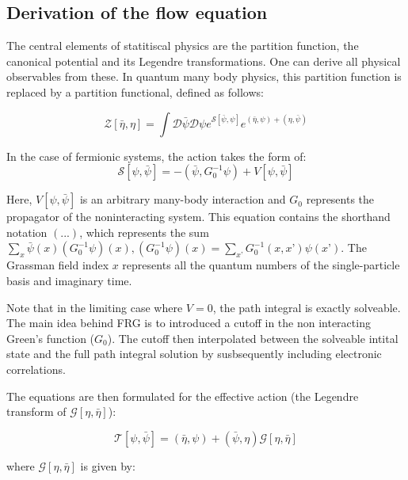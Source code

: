 \documentclass[12pt]{article}
\begin{document}
\subsection{Derivation of the flow equation}
The central elements of statitiscal physics are the partition function, the canonical potential and its Legendre transformations. One can derive all physical observables from these. In quantum many body physics, this partition function is replaced by a partition functional, defined as follows:

\begin{equation}\label{partition functional}
    \mathcal{Z}[\bar{\eta}, \eta] = \int \mathcal{D} \bar{\psi} \mathcal{D}\psi e^{\mathcal{S}[\bar{\psi}, \psi]}e^{(\bar{\eta}, \psi)+(\eta, \bar{\psi})}
\end{equation}

In the case of fermionic systems, the action takes the form of:
\begin{equation} \label{action}
    \mathcal{S}[\psi, \bar{\psi}] = -(\bar{\psi}, G_0^{-1} \psi) + V[\psi, \bar{\psi}]
\end{equation}

Here, $V[\psi, \bar{\psi}]$ is an arbitrary many-body interaction and $G_0$ represents the propagator of the noninteracting system. This equation contains the shorthand notation $(...)$, which represents the sum $\sum_x \bar{\psi}(x)(G_0^{-1}\psi)(x), (G_0^{-1}\psi)(x) = \sum_{x’}G_0^{-1}(x,x’)\psi(x’)$. The Grassman field index $x$ represents all the quantum numbers of the single-particle basis and imaginary time.



Note that in the limiting case where $V=0$, the path integral is exactly solveable. The main idea behind FRG is to introduced a cutoff in the non interacting Green's function ($G_0$). The cutoff then interpolated between the solveable intital state and the full path integral solution by susbsequently including electronic correlations. 


The equations are then formulated for the effective action (the Legendre transform of $\mathcal{G}[\eta, \bar{\eta}]$):

\begin{equation} \label{Effective action}
    \mathcal{T}[\psi, \bar{\psi}] = (\bar{\eta},\psi) + (\bar{\psi},\eta) \mathcal{G}[\eta, \bar{\eta}]
\end{equation}

where $\mathcal{G}[\eta, \bar{\eta}]$ is given by:
\end{document}
